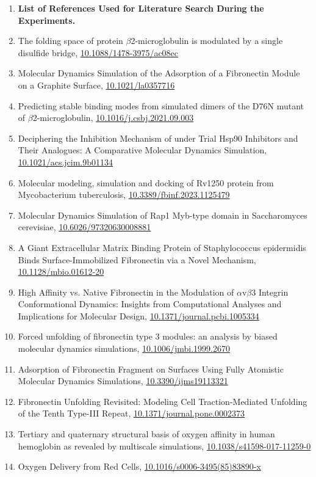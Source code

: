 \begin{enumerate}
    \label{references_table}
    \item[] \textbf{List of References Used for Literature Search During the Experiments.}
    \item The folding space of protein $\beta$2-microglobulin is modulated by a single disulfide bridge, \url{10.1088/1478-3975/ac08ec} 
    \item Molecular Dynamics Simulation of the Adsorption of a Fibronectin Module on a Graphite Surface, \url{10.1021/la0357716} 
    \item Predicting stable binding modes from simulated dimers of the D76N mutant of $\beta$2-microglobulin, \url{10.1016/j.csbj.2021.09.003} 
    \item Deciphering the Inhibition Mechanism of under Trial Hsp90 Inhibitors and Their Analogues: A Comparative Molecular Dynamics Simulation, \url{10.1021/acs.jcim.9b01134}
    \item Molecular modeling, simulation and docking of Rv1250 protein from Mycobacterium tuberculosis, \url{10.3389/fbinf.2023.1125479}
    \item Molecular Dynamics Simulation of Rap1 Myb-type domain in Saccharomyces cerevisiae, \url{10.6026/97320630008881}
    \item A Giant Extracellular Matrix Binding Protein of Staphylococcus epidermidis Binds Surface-Immobilized Fibronectin via a Novel Mechanism, \url{10.1128/mbio.01612-20}
    \item High Affinity vs. Native Fibronectin in the Modulation of $\alpha$v$\beta$3 Integrin Conformational Dynamics: Insights from Computational Analyses and Implications for Molecular Design, \url{10.1371/journal.pcbi.1005334}
    \item Forced unfolding of fibronectin type 3 modules: an analysis by biased molecular dynamics simulations, \url{10.1006/jmbi.1999.2670}
    \item Adsorption of Fibronectin Fragment on Surfaces Using Fully Atomistic Molecular Dynamics Simulations, \url{10.3390/ijms19113321}
    \item Fibronectin Unfolding Revisited: Modeling Cell Traction-Mediated Unfolding of the Tenth Type-III Repeat, \url{10.1371/journal.pone.0002373}
    \item Tertiary and quaternary structural basis of oxygen affinity in human hemoglobin as revealed by multiscale simulations, \url{10.1038/s41598-017-11259-0}
    \item Oxygen Delivery from Red Cells, \url{10.1016/s0006-3495(85)83890-x}

\end{enumerate}
